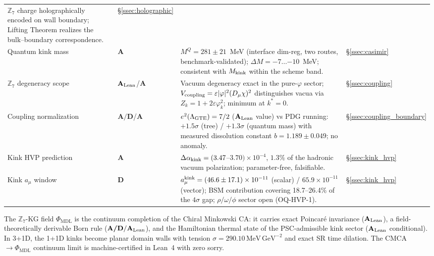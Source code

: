 \documentclass[11pt]{article}
\theoremstyle{remark}
\newcommand{\PHIMDL}{\Phi_{\mathrm{MDL}}}
\newcommand{\ZS}{\mathbb{Z}_7}
\newcommand{\Mkink}{M_{\rm kink}}
\newcommand{\CatA}{\textbf{A}}
\newcommand{\CatAL}{\ensuremath{\textbf{A}_{\rm Lean}}}
\newcommand{\CatAD}{\textbf{A/D}}
\newcommand{\CatD}{\textbf{D}}
\begin{document}
\begin{longtable}{@{}>{\raggedright\arraybackslash}p{2.9cm}>{\raggedright\arraybackslash}p{1.4cm}>{\raggedright\arraybackslash}p{8.7cm}>{\raggedright\arraybackslash}p{2.2cm}@{}}
  $\ZS$ charge holographically encoded on wall boundary;
  Lifting Theorem realizes the bulk--boundary correspondence. &
  \S\ref{ssec:holographic}\\
Quantum kink mass & $\CatA$ &
  $M^Q = 281\pm21$~MeV (interface dim-reg, two routes,
  benchmark-validated); $\Delta M = -7\ldots{-10}$~MeV; consistent with
  $\Mkink$ within the scheme band. &
  \S\ref{ssec:casimir}\\
$\ZS$ degeneracy scope & $\CatAL$/$\CatA$ &
  Vacuum degeneracy exact in the pure-$\varphi$ sector;
  $V_{\rm coupling}=\varepsilon|\varphi|^2(D_\mu\chi)^2$ distinguishes
  vacua via $Z_k = 1+2\varepsilon\varphi_k^2$; minimum at $k^\ast=0$. &
  \S\ref{ssec:coupling}\\
Coupling normalization & $\CatAD$/$\CatA$ &
  $e^2(\Lambda_{\rm GTE})=7/2$ ($\CatAL$ value) vs PDG running:
  $+1.5\sigma$ (tree) / $+1.3\sigma$ (quantum mass) with measured
  dissolution constant $b = 1.189\pm0.049$; no anomaly. &
  \S\ref{ssec:coupling_boundary}\\
Kink HVP prediction & $\CatA$ &
  $\Delta\alpha_{\rm kink} = (3.47$--$3.70)\times10^{-4}$,
  $1.3\%$ of the hadronic vacuum polarization; parameter-free,
  falsifiable. &
  \S\ref{ssec:kink_hvp}\\
Kink $a_\mu$ window & $\CatD$ &
  $a_\mu^{\rm kink} = (46.6\pm17.1)\times10^{-11}$ (scalar) /
  $65.9\times10^{-11}$ (vector); BSM contribution covering
  18.7--26.4\% of the $4\sigma$ gap; $\rho/\omega/\phi$ sector open
  (OQ-HVP-1). &
  \S\ref{ssec:kink_hvp}\\
\end{longtable}
\normalsize
\renewcommand{\arraystretch}{1}

\medskip

\begin{tcolorbox}[colback=green!4,colframe=green!45!black,
  title={\textbf{Central result}},
  fonttitle=\bfseries,left=6pt,right=6pt,top=4pt,bottom=4pt]
\small
The $\ZS$-KG field $\PHIMDL$ is the continuum completion of the Chiral
Minkowski CA: it carries exact Poincar\'e invariance ($\CatAL$), a
field-theoretically derivable Born rule ($\CatAD/\CatAL$), and the
Hamiltonian thermal state of the PSC-admissible kink sector ($\CatAL$
conditional).  In 3+1D, the 1+1D kinks become planar domain walls with
tension $\sigma = 290.10\,\mathrm{MeV\,GeV}^{-2}$ and exact SR time
dilation.  The CMCA$\to\PHIMDL$ continuum limit is machine-certified
in Lean~4 with zero sorry.
\end{tcolorbox}
\end{document}
